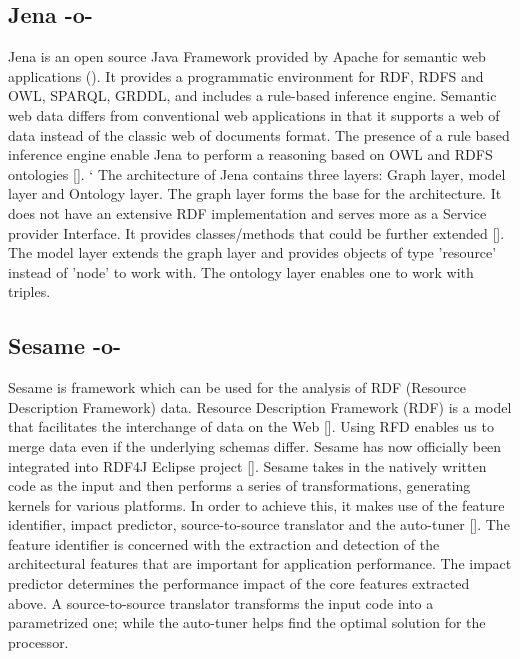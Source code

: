 \subsection{Jena -o-}

Jena is an open source Java Framework provided by Apache for semantic
web applications (\cite{www-w3-jena}). It provides a programmatic
environment for RDF, RDFS and OWL, SPARQL, GRDDL, and includes a
rule-based inference engine. Semantic web data differs from
conventional web applications in that it supports a web of data
instead of the classic web of documents format. The presence of a rule
based inference engine enable Jena to perform a reasoning based on OWL
and RDFS ontologies [\cite{www-trimc-nlp-blogspot}]. ` The architecture
of Jena contains three layers: Graph layer, model layer and Ontology
layer. The graph layer forms the base for the architecture. It does
not have an extensive RDF implementation and serves more as a Service
provider Interface. It provides classes/methods that could be further
extended [\cite{www-trimc-nlp-blogspot}].  The model layer extends the
graph layer and provides objects of type 'resource' instead of 'node'
to work with.  The ontology layer enables one to work with triples.



\subsection{Sesame -o-}

Sesame is framework which can be used for the analysis of RDF
(Resource Description Framework) data.  Resource Description Framework
(RDF) is a model that facilitates the interchange of data on the
Web [\cite{www-RDF}].  Using RFD enables us to merge data even if the
underlying schemas differ.  Sesame has now officially been integrated
into RDF4J Eclipse project [\cite{www-sesame}].  Sesame takes in the
natively written code as the input and then performs a series of
transformations, generating kernels for various platforms.  In order
to achieve this, it makes use of the feature identifier, impact
predictor, source-to-source translator and the
auto-tuner [\cite{sesame-paper-2013}].  The feature identifier is
concerned with the extraction and detection of the architectural
features that are important for application performance.  The impact
predictor determines the performance impact of the core features
extracted above.  A source-to-source translator transforms the input
code into a parametrized one; while the auto-tuner helps find the
optimal solution for the processor.


